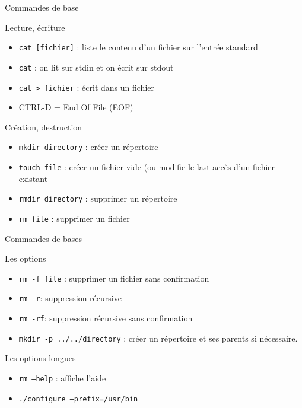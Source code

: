 \begin{frame}{Commandes de base}
\begin{block}{Lecture, écriture}
\begin{itemize}
\item \texttt{cat [fichier]} : liste le contenu d'un fichier sur l'entrée standard
\item \texttt{cat} : on  lit sur stdin et on écrit sur stdout
\item \texttt{cat > fichier} : écrit dans un fichier
\item CTRL-D = End Of File (EOF)
\end{itemize}

 
\end{block}

\begin{block}{Création, destruction}
\begin{itemize}
\item \texttt{mkdir directory} : créer un répertoire
\item \texttt{touch file} : créer un fichier vide (ou modifie le last accès d'un fichier existant
\item \texttt{rmdir directory} : supprimer un répertoire
\item \texttt{rm file} : supprimer un fichier
\end{itemize}
\end{block}
\end{frame}

\begin{frame}{Commandes de bases}
\begin{block}{Les options}
\begin{itemize}
\item \texttt{rm -f file} : supprimer un fichier sans confirmation
\item \texttt{rm -r}: suppression récursive
\item \texttt{rm -rf}: suppression récursive sans confirmation
\item \texttt{mkdir -p ../../directory} : créer un répertoire et ses parents si nécessaire.
\end{itemize}
\end{block}

\begin{block}{Les options longues}
\begin{itemize}
\item \texttt{rm --help} : affiche l'aide
\item \texttt{./configure --prefix=/usr/bin}
\end{itemize}
\end{block}
\end{frame}

